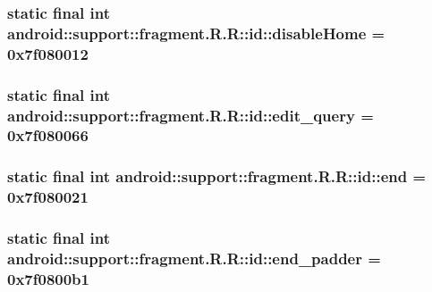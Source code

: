 \hypertarget{classandroid_1_1support_1_1fragment_1_1_r_1_1id_de66931c21d8e781d58d49443ff5b8f0}{
\subsubsection[{disableHome}]{\setlength{\rightskip}{0pt plus 5cm}static final int android::support::fragment.R.R::id::disableHome = 0x7f080012}}
\label{classandroid_1_1support_1_1fragment_1_1_r_1_1id_de66931c21d8e781d58d49443ff5b8f0}


\hypertarget{classandroid_1_1support_1_1fragment_1_1_r_1_1id_8649b3a9c8ada4683783c00c7f30b139}{
\subsubsection[{edit\_\-query}]{\setlength{\rightskip}{0pt plus 5cm}static final int android::support::fragment.R.R::id::edit\_\-query = 0x7f080066}}
\label{classandroid_1_1support_1_1fragment_1_1_r_1_1id_8649b3a9c8ada4683783c00c7f30b139}


\hypertarget{classandroid_1_1support_1_1fragment_1_1_r_1_1id_460384ac077e82b4a35a10d2c586123f}{
\subsubsection[{end}]{\setlength{\rightskip}{0pt plus 5cm}static final int android::support::fragment.R.R::id::end = 0x7f080021}}
\label{classandroid_1_1support_1_1fragment_1_1_r_1_1id_460384ac077e82b4a35a10d2c586123f}


\hypertarget{classandroid_1_1support_1_1fragment_1_1_r_1_1id_f43fd4bbff5340187282c080f11bae4b}{
\subsubsection[{end\_\-padder}]{\setlength{\rightskip}{0pt plus 5cm}static final int android::support::fragment.R.R::id::end\_\-padder = 0x7f0800b1}}
\label{classandroid_1_1support_1_1fragment_1_1_r_1_1id_f43fd4bbff5340187282c080f11bae4b}


